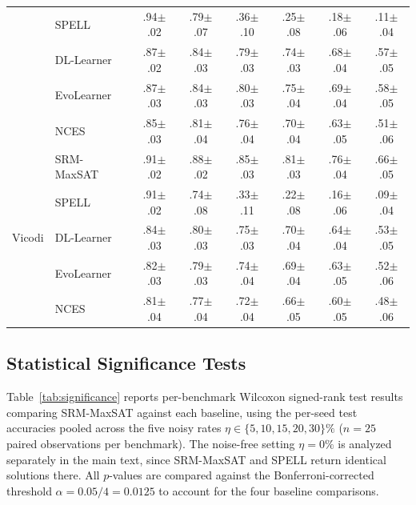 \documentclass[accepted]{uai2026} %
\theoremstyle{definition}
\theoremstyle{remark}
\begin{document}
\begin{table}[ht]
\begin{tabular}{@{}llcccccc@{}}
    & SPELL & .94\tiny$\pm$.02 & .79\tiny$\pm$.07
      & .36\tiny$\pm$.10 & .25\tiny$\pm$.08
      & .18\tiny$\pm$.06 & .11\tiny$\pm$.04 \\
    & DL-Learner & .87\tiny$\pm$.02 & .84\tiny$\pm$.03
      & .79\tiny$\pm$.03 & .74\tiny$\pm$.03
      & .68\tiny$\pm$.04 & .57\tiny$\pm$.05 \\
    & EvoLearner & .87\tiny$\pm$.03 & .84\tiny$\pm$.03
      & .80\tiny$\pm$.03 & .75\tiny$\pm$.04
      & .69\tiny$\pm$.04 & .58\tiny$\pm$.05 \\
    & NCES & .85\tiny$\pm$.03 & .81\tiny$\pm$.04
      & .76\tiny$\pm$.04 & .70\tiny$\pm$.04
      & .63\tiny$\pm$.05 & .51\tiny$\pm$.06 \\
    \midrule
    \multirow{5}{*}{Vicodi}
    & SRM-MaxSAT & .91\tiny$\pm$.02 & .88\tiny$\pm$.02
      & .85\tiny$\pm$.03 & .81\tiny$\pm$.03
      & .76\tiny$\pm$.04 & .66\tiny$\pm$.05 \\
    & SPELL & .91\tiny$\pm$.02 & .74\tiny$\pm$.08
      & .33\tiny$\pm$.11 & .22\tiny$\pm$.08
      & .16\tiny$\pm$.06 & .09\tiny$\pm$.04 \\
    & DL-Learner & .84\tiny$\pm$.03 & .80\tiny$\pm$.03
      & .75\tiny$\pm$.03 & .70\tiny$\pm$.04
      & .64\tiny$\pm$.04 & .53\tiny$\pm$.05 \\
    & EvoLearner & .82\tiny$\pm$.03 & .79\tiny$\pm$.03
      & .74\tiny$\pm$.04 & .69\tiny$\pm$.04
      & .63\tiny$\pm$.05 & .52\tiny$\pm$.06 \\
    & NCES & .81\tiny$\pm$.04 & .77\tiny$\pm$.04
      & .72\tiny$\pm$.04 & .66\tiny$\pm$.05
      & .60\tiny$\pm$.05 & .48\tiny$\pm$.06 \\
    \bottomrule
  \end{tabular}
\end{table}

\subsection{Statistical Significance Tests}\label{app:significance}

Table~\ref{tab:significance} reports per-benchmark Wilcoxon
signed-rank test results comparing SRM-MaxSAT against each
baseline, using the per-seed test accuracies pooled across the
five noisy rates $\eta \in \{5, 10, 15, 20, 30\}\%$ ($n = 25$
paired observations per benchmark).  The noise-free setting
$\eta = 0\%$ is analyzed separately in the main text, since
SRM-MaxSAT and SPELL return identical solutions there.  All
$p$-values are compared against the Bonferroni-corrected
threshold $\alpha = 0.05/4 = 0.0125$ to account for the four
baseline comparisons.
\end{document}

